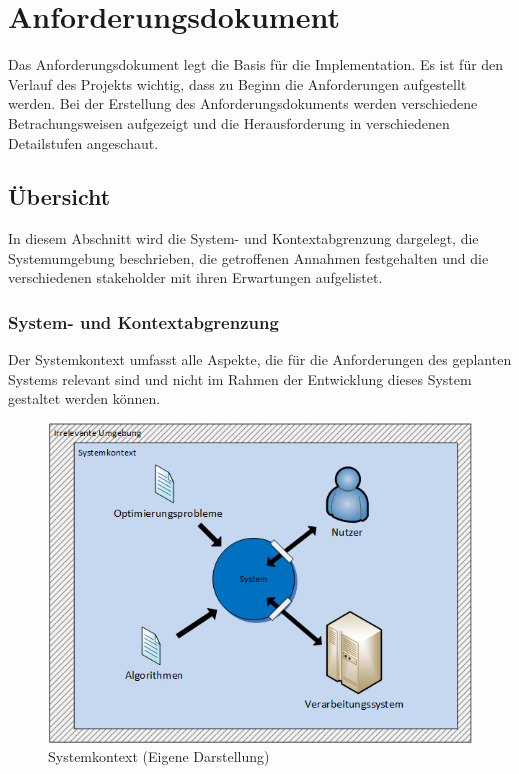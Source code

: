 %
%

\chapter{Anforderungsdokument \resultAssignment{[R3]}}\label{chap.anforderungsdokument}

Das Anforderungsdokument legt die Basis für die Implementation. Es ist für den Verlauf des Projekts wichtig, dass zu Beginn die Anforderungen aufgestellt werden. Bei der 
Erstellung des Anforderungsdokuments werden verschiedene Betrachungsweisen aufgezeigt und die Herausforderung in verschiedenen Detailstufen angeschaut.


\section{Übersicht}\label{anf_uebersicht}

In diesem Abschnitt  wird die System- und Kontextabgrenzung dargelegt, die Systemumgebung beschrieben, die getroffenen Annahmen festgehalten und die verschiedenen \gls{stakeholder} mit 
ihren Erwartungen aufgelistet.

\subsection{System- und Kontextabgrenzung}\label{systemabgrenzung}
Der Systemkontext umfasst alle Aspekte, die für die Anforderungen des geplanten Systems relevant sind und nicht im Rahmen der Entwicklung dieses System gestaltet werden können.
\cite{req_eng_book} 

\begin{figure}[h]
\centering
\includegraphics[scale=0.8]{images/visio/systemkontext.png}
\caption[Systemkontext]{Systemkontext (Eigene Darstellung)}
\label{fig:systemkontext}
\end{figure}

